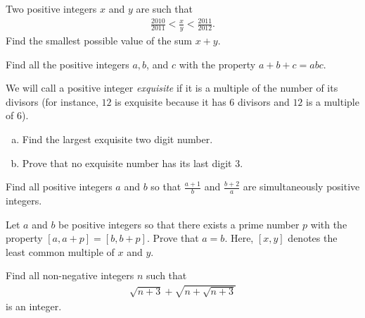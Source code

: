\documentclass[problems.tex]{subfile}
\begin{document}
	
	
	\begin{problem}
		Two positive integers $x$ and $y$ are such that
		\begin{align*}
			\frac{2010}{2011} < \frac{x}{y} < \frac{2011}{2012}.
		\end{align*}
		Find the smallest possible value of the sum $x + y$.
	\end{problem}
	
	
	\begin{problem}
		Find all the positive integers $a, b$, and $c$ with the property $a + b + c = abc$.
	\end{problem}
	
	
	
	\begin{problem}
		We will call a positive integer \textit{exquisite} if it is a multiple of the number of its divisors (for instance, $12$ is exquisite because it has $6$ divisors and $12$ is a multiple	of $6$).
		\begin{enumerate}[(a)]
			\item Find the largest exquisite two digit number.
			\item Prove that no exquisite number has its last digit $3$.
		\end{enumerate}
	\end{problem}
	
	
	
	\begin{problem}
		Find all positive integers $a$ and $b$ so that $\frac{a + 1}{b}$ and $\frac{b+2}{a}$ are simultaneously positive integers.
	\end{problem}
	
	
	
	\begin{problem}
		Let $a$ and $b$ be positive integers so that there exists a prime number $p$ with the property $[a, a + p] = [b, b + p]$. Prove that $a = b$. Here, $[x, y]$ denotes the least common multiple of $x$ and $y$.
	\end{problem}
	
	
	
	\begin{problem}
		Find all non-negative integers $n$ such that
		\begin{align*}
			\sqrt{n+3} + \sqrt{n+\sqrt{n+3}}
		\end{align*}
		is an integer.
	\end{problem}
	
\end{document}
